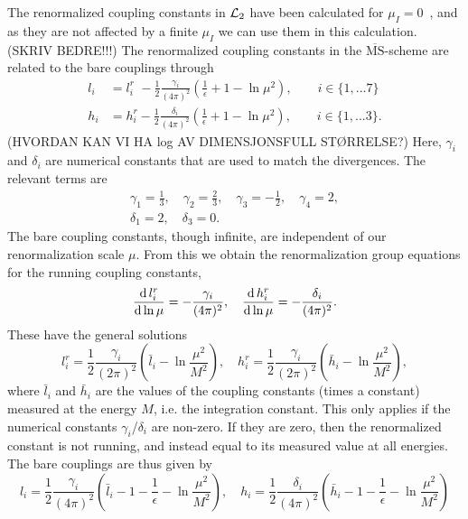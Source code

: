 The renormalized coupling constants in $\mathcal{L}_2$ have been calculated for $\mu_I = 0$~\cite{Gasser-Leutwyler:chiral}, and as they are not affected by a finite $\mu_I$ we can use them in this calculation. (SKRIV BEDRE!!!)
The renormalized coupling constants in the $\overline{\mathrm{MS}}$-scheme are related to the bare couplings through
\begin{align}
    l_i 
    & = 
    l_i^r \, \,
    - \frac{1}{2} \frac{\gamma_i }{(4 \pi)^2} 
    \left(\frac{1}{\epsilon} + 1 - \ln \mu^2\right),
    \quad \quad
    i \in \{1, ... 7\} 
    \\
    h_i 
    & = 
    h_i^r
    - \frac{1}{2} \frac{\delta_i }{(4 \pi)^2} 
    \left(\frac{1}{\epsilon} + 1 - \ln \mu^2 \right), 
    \quad \quad
    i \in \{1, ... 3\}.
\end{align}
(HVORDAN KAN VI HA log AV DIMENSJONSFULL STØRRELSE?)
Here, $\gamma_i$ and $\delta_i$ are numerical constants that are used to match the divergences.
The relevant terms are
\begin{gather}
    \gamma_1 = \frac{1}{3}, \quad
    \gamma_2 = \frac{2}{3}, \quad
    \gamma_3 = - \frac{1}{2}, \quad
    \gamma_4 = 2, \\
    \delta_1 = 2, \quad
    \delta_3 = 0.
\end{gather}
The bare coupling constants, though infinite, are independent of our renormalization scale $\mu$.
From this we obtain the renormalization group equations for the running coupling constants,
\begin{equation}
    \diff{\, l_i^r}{\ln \mu } = - \frac{\gamma_i}{(4 \pi)^2}, \quad
    \diff{\, h_i^r}{\ln \mu } = - \frac{\delta_i}{(4 \pi)^2}.
\end{equation}
These have the general solutions
\begin{equation}
    l_i^r 
    = \frac{1}{2} \frac{\gamma_i}{(2 \pi)^2} 
    \left( \bar l_i - \ln{\frac{\mu^2}{M^2}} \right),
    \quad
    h_i^r 
    = \frac{1}{2} \frac{\gamma_i}{(2 \pi)^2} 
    \left( \bar h_i - \ln{\frac{\mu^2}{M^2}} \right),
\end{equation}
where $\bar l_i$ and $\bar h_i$ are the values of the coupling constants (times a constant) measured at the energy $M$, i.e. the integration constant.
This only applies if the numerical constants $\gamma_i$/$\delta_i$ are non-zero.
If they are zero, then the renormalized constant is not running, and instead equal to its measured value at all energies.
The bare couplings are thus given by
\begin{equation}
    l_i = \frac{1}{2} \frac{\gamma_i}{(4 \pi)^2}
    \left(\bar l_i - 1 - \frac{1}{\epsilon} - \ln\frac{\mu^2}{M^2}\right), \quad
    h_i = \frac{1}{2} \frac{\delta_i}{(4 \pi)^2}
    \left(\bar h_i - 1 - \frac{1}{\epsilon} - \ln\frac{\mu^2}{M^2}\right)
\end{equation}
